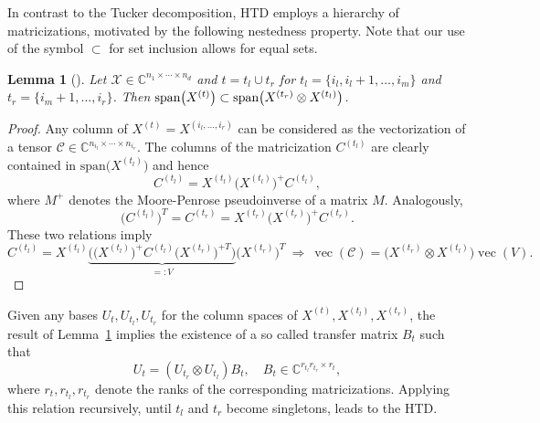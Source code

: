 \documentclass[11pt, a4paper]{article}
\newcommand{\calC}{\mathcal{C}}
\newcommand{\calX}{\mathcal{X}}
\newcommand{\C}{{\mathbb C}}
\newtheorem{lemma}[theorem]{\bf Lemma}
\DeclareMathOperator{\vect}{vec}
\begin{document}
In contrast to the Tucker decomposition, HTD employs a
hierarchy of matricizations, motivated by the following nestedness property.
Note that our use of the symbol $\subset$ for set inclusion allows for equal sets.
\begin{lemma}[{\cite[Lemma 17]{Gra10summer}}] \label{lemma:nested}
 Let $\calX \in \C^{n_1\times \cdots \times n_d}$ and $t = t_l\cup t_r$ for $t_l = \{i_l, i_l+1, \ldots, i_m\}$ and $t_r = \{i_m+1, \ldots, i_r\}$. Then $\text{\rm span}\big(X^{(t)}\big)\subset \text{\rm span}\big(X^{(t_r)} \otimes X^{(t_l)}\big)$.
\end{lemma}
\begin{proof}
Any column of $X^{(t)} = X^{(i_l,\ldots,i_r)}$ can be considered as the vectorization of a tensor $\calC \in 
\C^{n_{i_l}\times \cdots \times n_{i_r}}$. The columns of the matricization $C^{(t_l)}$ are
clearly contained in $\text{span}\big(X^{(t_l)}\big)$ and hence
\[
 C^{(t_l)} = X^{(t_l)} \big(X^{(t_l)}\big)^+ C^{(t_l)},
\]
where $M^+$ denotes the Moore-Penrose pseudoinverse of a matrix $M$. Analogously,
\[
 \big( C^{(t_l)} \big)^T = C^{(t_r)} = X^{(t_r)} \big(X^{(t_r)}\big)^+ C^{(t_r)}.
\]
These two relations imply \[
C^{(t_l)} =  X^{(t_l)} \underbrace{\Big( \big(X^{(t_l)}\big)^+ C^{(t_l)}  \big(X^{(t_r)}\big)^{+T} \Big)}_{=:V} \big(X^{(t_r)}\big)^{T}
\ \Rightarrow\ 
\vect(\calC) = \big(X^{(t_r)} \otimes X^{(t_l)}\big) \vect(V).
\]
\end{proof}
\noindent Given any bases $U_t,U_{t_l},U_{t_r}$ for the column spaces
of $X^{(t)}, X^{(t_l)}, X^{(t_r)}$, the result of
Lemma~\ref{lemma:nested} implies the existence of a so called transfer
matrix $B_t$ such that
\begin{equation} \label{eq:nestedmatrix}
 U_t = (U_{t_r} \otimes U_{t_l}) B_t, \quad B_t \in \C^{r_{t_l} r_{t_r} \times r_t},
\end{equation}
where $r_t, r_{t_l},r_{t_r}$ denote the ranks of the corresponding
matricizations. Applying this relation recursively, until $t_l$ and
$t_r$ become singletons, leads to the HTD.
\end{document}
